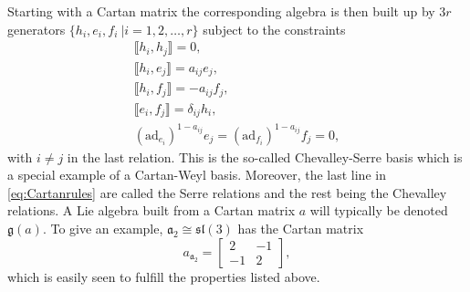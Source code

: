 Starting with a Cartan matrix the corresponding algebra is then built up by $3r$ generators $\{h_i,e_i,f_i\ |i=1,2,\ldots,r\}$ subject to the constraints
\begin{equation}
\begin{aligned}\label{eq:Cartanrules}
    \llbracket h_i,h_j\rrbracket = 0,\\
    \llbracket h_i,e_j\rrbracket = a_{ij}e_{j},\\
    \llbracket h_i,f_j\rrbracket = -a_{ij}f_{j},\\
    \llbracket e_i,f_j\rrbracket = \delta_{ij}h_i,\\
    (\text{ad}_{e_i})^{1-a_{ij}}e_j = (\text{ad}_{f_i})^{1-a_{ij}}f_j = 0,
\end{aligned}
\end{equation}
with $i\neq j$ in the last relation. This is the so-called Chevalley-Serre basis which is a special example of a Cartan-Weyl basis. Moreover, the last line in \eqref{eq:Cartanrules} are called the Serre relations and the rest being the Chevalley relations. A Lie algebra built from a Cartan matrix $a$ will typically be denoted $\mathfrak{g}(a)$. To give an example, $\mathfrak{a}_2\cong \mathfrak{sl}(3)$ has the Cartan matrix
\begin{equation}
    a_\mathfrak{a_2}=\begin{bmatrix}2&-1\\-1&2\end{bmatrix},
\end{equation}
which is easily seen to fulfill the properties listed above. 

